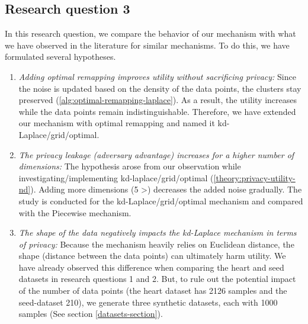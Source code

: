 \subsection{Research question 3} \label{method:research-question-3}
In this research question, we compare the behavior of our mechanism with what we have observed in the literature for similar mechanisms.
To do this, we have formulated several hypotheses.
\begin{enumerate}
  \item \textit{Adding optimal remapping improves utility without sacrificing privacy:}
        Since the noise is updated based on the density of the data points, the clusters stay preserved (\ref{alg:optimal-remapping-laplace}).
        As a result, the utility increases while the data points remain indistinguishable.
        Therefore, we have extended our mechanism with optimal remapping and named it kd-Laplace/grid/optimal.
  \item \textit{The privacy leakage (adversary advantage) increases for a higher number of dimensions:}
        The hypothesis arose from our observation while investigating/implementing kd-laplace/grid/optimal (\ref{theory:privacy-utility-nd}).
        Adding more dimensions (5 >) decreases the added noise gradually.
        The study is conducted for the kd-Laplace/grid/optimal mechanism and compared with the Piecewise mechanism.
  \item \textit{The shape of the data negatively impacts the kd-Laplace mechanism in terms of privacy:}
        Because the mechanism heavily relies on Euclidean distance, the shape (distance between the data points) can ultimately harm utility.
        We have already observed this difference when comparing the heart and seed datasets in research questions 1 and 2.
        But, to rule out the potential impact of the number of data points (the heart dataset has 2126 samples and the seed-dataset 210), we generate three synthetic datasets, each with 1000 samples (See section \ref{datasets-section}).

\end{enumerate}
